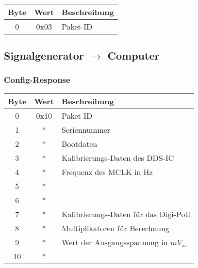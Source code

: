 \begin{flushleft}
\begin{tabular}{c||c|l}
Byte & Wert & Beschreibung \\
\hline
\hline
0 & 0x03 & Paket-ID \\

\end{tabular}
\end{flushleft}


\subsection{Signalgenerator $\rightarrow$ Computer}

\subsubsection{Config-Response}

\begin{tabular}{c||c|l}
Byte & Wert & Beschreibung \\
\hline
\hline
0 & 0x10 & Paket-ID \\
\hline
1 & * & Seriennummer \\
\hline
2 & * & Bootdaten \\
\hline
3 & * & Kalibrierungs-Daten des DDS-IC \\
4 & * & Frequenz des MCLK in Hz \\
5 & * &  \\
6 & * &  \\
\hline
7 & * & Kalibrierungs-Daten für das Digi-Poti \\
8 & * & Multiplikatoren für Berechnung \\
\hline
9 & * & Wert der Ausgangsspannung in $mV_{ss}$ \\
10 & * & \\
\end{tabular}
